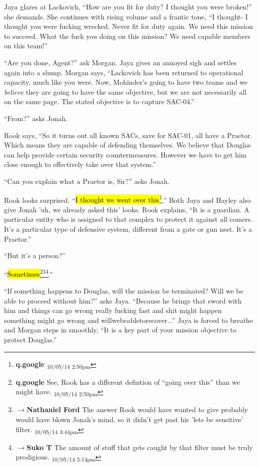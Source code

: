 Jaya glares at Lackovich, ``How are you fit for duty?  I thought you were broken!'' she demands.  She continues with rising volume and a frantic tone, ``I thought- I thought you were fucking wrecked.  Never fit for duty again.  We need this mission to succeed.  What the fuck you doing on this mission?  We need capable members on this team!''

``Are you done, Agent?'' ask Morgan.  Jaya gives an annoyed sigh and settles again into a slump.  Morgan says, ``Lackovich has been returned to operational capacity, much like you were.  Now, Mohinder's going to have two teams and we \textit{believe }they are going to have the same objective, but we are not necessarily all on the same page.  The stated objective is to capture SAC-04.''

``From?'' asks Jonah.

Rook says, ``So it turns out all known SACs, save for SAC-01, all have a Praetor.  Which means they are capable of defending themselves.  We believe that Douglas can help provide certain security countermeasures.  However we have to get him close enough to effectively take over that system.''

``Can you explain what a Praetor is, Sir?'' asks Jonah.

Rook looks surprised.  ``\hl{I thought we went over this}\footnote{\textbf{q.google } \textsubscript{10/05/14 2:50pm}}.''  Both Jaya and Hayley also give Jonah 'uh, we already asked this' looks.  Rook explains, ``It is a guardian.  A particular entity who is assigned to that complex to protect it against all comers.  It's a particular type of defensive system, different from a gate or gun nest.  It's a Praetor.''

``But it's a person?''

``\hl{Sometimes}\footnote{\textbf{q.google }See, Rook has a different defintion of ``going over this'' than we might have. \textsubscript{10/05/14 2:50pm}}\footnote{$\rightarrow$\textbf{Nathaniel Ford }The answer Rook would have wanted to give probably would have blown Jonah's mind, so it didn't get past his 'lets be sensitive' filter. \textsubscript{10/05/14 3:44pm}}\footnote{$\rightarrow$\textbf{Suko T }The amount of stuff that gets caught by that filter must be truly prodigious. \textsubscript{10/05/14 5:14pm}}.''

``If something happens to Douglas, will the mission be terminated?  Will we be able to proceed without him?'' asks Jaya.  ``Because he brings that sword with him and things can go wrong really fucking fast and shit might happen something might go wrong and willwebeabletorecover...''  Jaya is forced to breathe and Morgan steps in smoothly, ``It is a key part of your mission objective to protect Douglas.''

